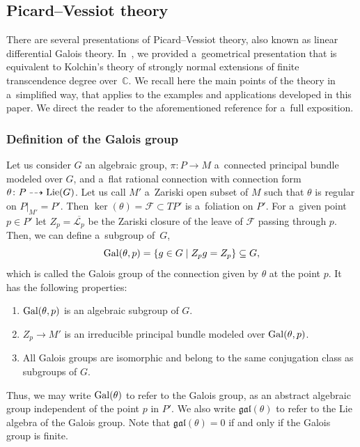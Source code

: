 \documentclass[pdftex]{sigma}
\numberwithin{equation}{section}
\theoremstyle{definition}
\begin{document}
\subsection{Picard--Vessiot theory}

There are several presentations of Picard--Vessiot theory, also known as linear differential Galois theory. In~\cite[Appendix~A]{bc2017}, we provided a~geometrical presentation that is equivalent to Kolchin's theory of strongly normal extensions of finite transcendence degree over~$\mathbb C$. We recall here the main points of the theory in a~simplified way, that applies to the examples and applications developed in this paper. We direct the reader to the aforementioned reference for a~full exposition.

\subsubsection{Definition of the Galois group}

Let us consider $G$ an algebraic group, $\pi\colon P\to M$ a~connected principal bundle modeled over $G$, and a~flat rational connection with connection form $\theta\colon P \dasharrow {\rm Lie}(G)$.
Let us call $M'$ a~Zariski open subset of $M$ such that $\theta$ is regular on $P|_{M'} = P'$. Then $\ker(\theta) = \mathcal F \subset TP'$ is a~foliation on $P'$. For a~given point $p\in P'$ let $Z_p = \overline{\mathcal L_p}$ be the Zariski closure of the leave of $\mathcal F$ passing through $p$. Then, we can define a~subgroup of~$G$,
\[
{\rm Gal}(\theta, p) = \{g\in G \mid Z_pg = Z_p \} \subseteq G,
\]
which is called the Galois group of the connection given by $\theta$ at the point $p$. It has the following properties:
\begin{enumerate}\itemsep=0pt
\item[(1)] ${\rm Gal}(\theta, p)$ is an algebraic subgroup of $G$.
\item[(2)] $Z_p \to M'$ is an irreducible principal bundle modeled over ${\rm Gal}(\theta, p)$.
\item[(3)] All Galois groups are isomorphic and belong to the same conjugation class as subgroups of $G$.
\end{enumerate}

Thus, we may write ${\rm Gal}(\theta)$ to refer to the Galois group, as an abstract algebraic group independent of the point $p$ in $P'$. We also write $\mathfrak{gal}(\theta)$ to refer to the Lie algebra of the Galois group. Note that $\mathfrak{gal}(\theta) = 0$ if and only if the Galois group is finite.
\end{document}
